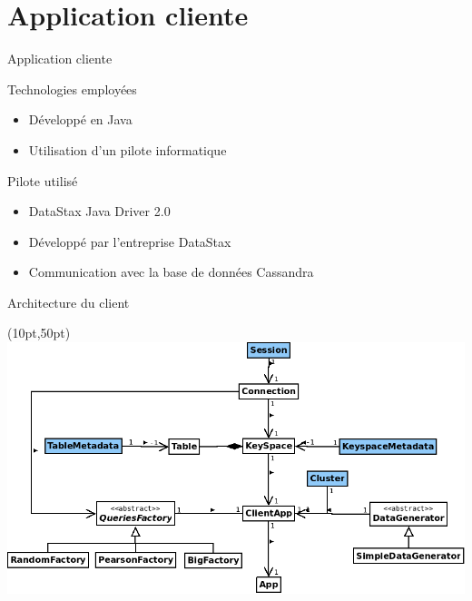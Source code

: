 \documentclass{beamer}
\begin{document}
\section{Application cliente}
\begin{frame}{Application cliente}

\begin{block}{Technologies employées}
\begin{itemize}
    \item Développé en Java
    \item Utilisation d'un pilote informatique
\end{itemize}
\end{block}

\begin{block}{Pilote utilisé}
\begin{itemize}
    \item DataStax Java Driver 2.0
    \item Développé par l'entreprise DataStax
    \item Communication avec la base de données Cassandra
\end{itemize}
\end{block}


\end{frame}

\begin{frame}{Architecture du client}
\begin{textblock*}{\paperwidth}(10pt,50pt)
    \includegraphics[scale=0.4]{architecture_client}
\end{textblock*}
\end{frame}
\end{document}
